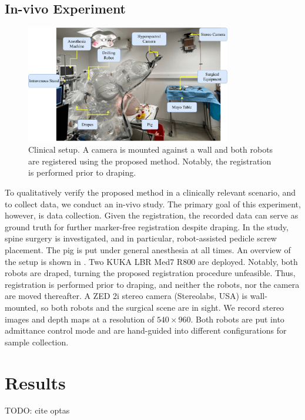 \subsection{In-vivo Experiment}
\begin{figure}[tb]
    \centering
    \includegraphics[width=0.8\textwidth]{chapter_1/img/in_vivo_setup.pdf}
    \caption{Clinical setup. A camera is mounted against a wall and both robots are registered using the proposed method. Notably, the registration is performed prior to draping.}
    \label{c1:fig:in_vivo_setup}
\end{figure}
To qualitatively verify the proposed method in a clinically relevant scenario, and to collect data, we conduct an in-vivo study. The primary goal of this experiment, however, is data collection. Given the registration, the recorded data can serve as ground truth for further marker-free registration despite draping. In the study, spine surgery is investigated, and in particular, robot-assisted pedicle screw placement. The pig is put under general anesthesia at all times. An overview of the setup is shown in . Two KUKA LBR Med7 R800 are deployed. Notably, both robots are draped, turning the proposed registration procedure unfeasible. Thus, registration is performed prior to draping, and neither the robots, nor the camera are moved thereafter. A ZED 2i stereo camera (Stereolabs, USA) is wall-mounted, so both robots and the surgical scene are in sight. We record stereo images and depth maps at a resolution of $540 \times 960$. Both robots are put into admittance control mode and are hand-guided into different configurations for sample collection.

\section{Results}
\label{c1:sec:results}
TODO: cite optas  \cite{optas} %


